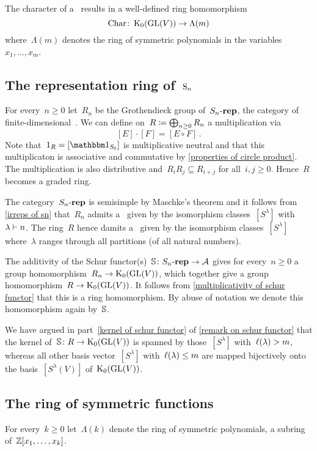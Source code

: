 \documentclass[a4paper,10pt]{scrartcl}
\begin{document}
The character of a~{} results in a well-defined ring homomorphism
\[
  \operatorname{Char}
  \colon
  \operatorname{K}_0(\operatorname{GL}(V))
  \to
  \Lambda(m)
\]
where~$\Lambda(m)$ denotes the ring of symmetric polynomials in the variables~$x_1, \dotsc, x_m$.


\subsection{The representation ring of~$\operatorname{S}_n$}

For every~$n \geq 0$ let~$R_n$ be the Grothendieck group of~$S_n\text{-}\mathbf{rep}$, the category of finite-dimensional~{}.
We can define on~$R \coloneqq \bigoplus_{n \geq 0} R_n$ a multiplication via
\[
  [E] \cdot [F]
  =
  [E \circ F] \,.
\]
Note that~$1_R = [\trivrep_{S_0}]$ is multiplicative neutral and that this multiplicaton is associative and commutative by \cref{properties of circle product}.
The multiplication is also distributive and~$R_i R_j \subseteq R_{i+j}$ for all~$i,j \geq 0$.
Hence~$R$ becomes a graded ring.

The category~$S_n\text{-}\mathbf{rep}$ is semisimple by Maschke’s theorem and it follows from \cref{irreps of sn} that~$R_n$ admits a~{\basis{$\Integer$}} given by the isomorphism classes~$[S^\lambda]$ with~$\lambda \vdash n$.
The ring~$R$ hence damits a~{\basis{$\Integer$}} given by the isomorphism classes~$[S^\lambda]$ where~$\lambda$ ranges through all partitions (of all natural numbers).

The additivity of the Schur functor(s)~$\mathbb{S} \colon S_n\text{-}\mathbf{rep} \to \mathcal{A}$ gives for every~$n \geq 0$ a group homomorphism~$R_n \to \operatorname{K}_0(\operatorname{GL}(V))$, which together give a group homomorphism~$R \to \operatorname{K}_0(\operatorname{GL}(V))$.
It follows from \cref{multiplicativity of schur functor} that this is a ring homomorphism.
By abuse of notation we denote this homomorphism again by~$\mathbb{S}$.

We have argued in part~\ref{kernel of schur functor} of \cref{remark on schur functor} that the kernel of~$\mathbb{S} \colon R \to \operatorname{K}_0(\operatorname{GL}(V))$ is spanned by those~$[S^\lambda]$ with~$\operatorname{\ell}(\lambda) > m$, whereas all other basis vector~$[S^\lambda]$ with~$\operatorname{\ell}(\lambda) \leq m$ are mapped bijectively onto the basis~$[S^\lambda(V)]$ of~$\operatorname{K}_0(\operatorname{GL}(V))$.


\subsection{The ring of symmetric functions}

For every~$k \geq 0$ let~$\Lambda(k)$ denote the ring of symmetric polynomials, a subring of~$\mathbb{Z}[x_1, \dotsc, x_k]$.
\end{document}
